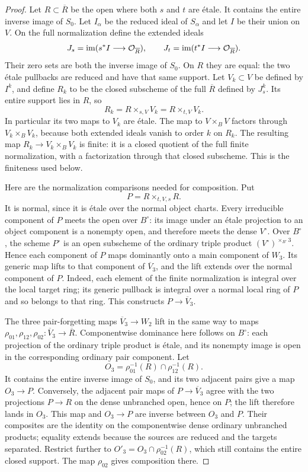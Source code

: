 \begin{proof}
Let $R\subset\overline R$ be the open where both $s$ and $t$ are
\'etale.  It contains the entire inverse image of $S_0$.  Let
$I_\alpha$ be the reduced ideal of $S_\alpha$ and let $I$ be their
union on $V$.  On the full normalization define the extended ideals
\[
 J_s=\operatorname{im}(s^*I\longrightarrow\mathcal O_{\overline R}),\qquad
 J_t=\operatorname{im}(t^*I\longrightarrow\mathcal O_{\overline R}).
\]
Their zero sets are both the inverse image of $S_0$.  On $R$ they are
equal: the two \'etale pullbacks are reduced and have that same support.
Let $V_k\subset V$ be defined by $I^k$, and define $R_k$ to be the
closed subscheme of the full $\overline R$ defined by $J_s^k$.
Its entire support lies in $R$, so
\[
 R_k=R\times_{s,V}V_k=R\times_{t,V}V_k.
\]
In particular its two maps to $V_k$ are \'etale.  The map to
$V\times_BV$ factors through $V_k\times_BV_k$, because both extended
ideals vanish to order $k$ on $R_k$.  The resulting map
$R_k\to V_k\times_BV_k$ is finite: it is a closed quotient of the
full finite normalization, with a factorization through that closed
subscheme.  This is the finiteness used below.

Here are the normalization comparisons needed for composition.  Put
\[
 P=R\times_{t,V,s}R.
\]
It is normal, since it is \'etale over the normal object charts.
Every irreducible component of $P$ meets the open over $B^\circ$:
its image under an \'etale projection to an object component is a
nonempty open, and therefore meets the dense $V^\circ$.  Over
$B^\circ$, the scheme $P^\circ$ is an open subscheme of the ordinary
triple product $(V^\circ)^{\times_{B^\circ}3}$.  Hence each component
of $P$ maps dominantly onto a main component of $W_3$.  Its generic
map lifts to that component of $\overline V_3$, and the lift extends
over the normal component of $P$.  Indeed, each element of the
finite normalization is integral over the local target ring; its
generic pullback is integral over a normal local ring of $P$ and so
belongs to that ring.  This constructs $P\to\overline V_3$.

The three pair-forgetting maps $\overline V_3\to W_2$ lift in the
same way to maps $\rho_{01},\rho_{12},\rho_{02}:\overline V_3\to
\overline R$.  Componentwise dominance here follows on $B^\circ$:
each projection of the ordinary triple product is \'etale, and its
nonempty image is open in the corresponding ordinary pair component.
Let
\[
 O_3=\rho_{01}^{-1}(R)\cap\rho_{12}^{-1}(R).
\]
It contains the entire inverse image of $S_0$, and its two adjacent
pairs give a map $O_3\to P$.  Conversely, the adjacent pair maps of
$P\to\overline V_3$ agree with the two projections $P\to R$ on the
dense unbranched open, hence on $P$; the lift therefore lands in $O_3$.
This map and $O_3\to P$ are
inverse between $O_3$ and $P$.  Their composites are the identity
on the componentwise dense ordinary unbranched products; equality
extends because the sources are reduced and the targets separated.
Restrict further to
$O'_3=O_3\cap\rho_{02}^{-1}(R)$, which still contains the entire
closed support.  The map $\rho_{02}$ gives composition there.


\end{proof}
